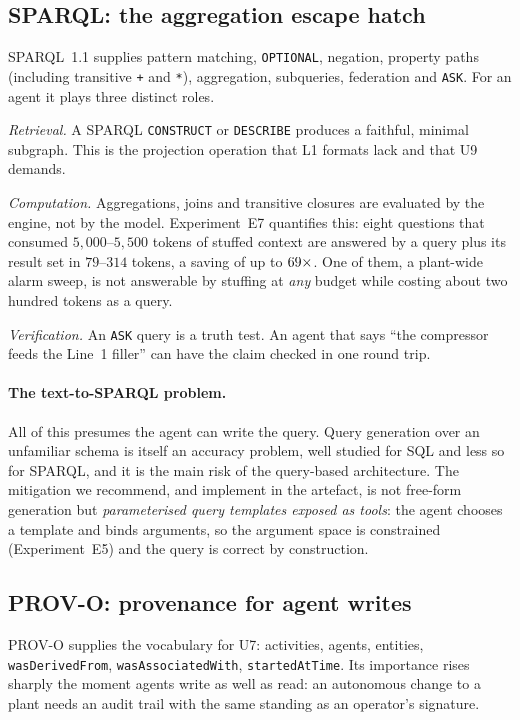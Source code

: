 \subsection{SPARQL: the aggregation escape hatch}

SPARQL~1.1 \cite{w3c2013sparql} supplies pattern matching, \texttt{OPTIONAL},
negation, property paths (including transitive \texttt{+} and \texttt{*}),
aggregation, subqueries, federation and \texttt{ASK}. For an agent it plays three distinct roles.

\emph{Retrieval.} A SPARQL \texttt{CONSTRUCT} or \texttt{DESCRIBE} produces a
faithful, minimal subgraph. This is the projection operation that L1 formats lack
and that U9 demands.

\emph{Computation.} Aggregations, joins and transitive closures are evaluated by
the engine, not by the model. Experiment~E7 quantifies this: eight questions that
consumed $5{,}000$--$5{,}500$ tokens of stuffed context are answered by a query
plus its result set in $79$--$314$ tokens, a saving of up to
$69\times$. One of them, a plant-wide alarm sweep, is not
answerable by stuffing at \emph{any} budget while costing about two hundred
tokens as a query.

\emph{Verification.} An \texttt{ASK} query is a truth test. An agent that says
``the compressor feeds the Line~1 filler'' can have the claim checked in one
round trip.

\paragraph{The text-to-SPARQL problem.} All of this presumes the agent can write
the query. Query generation over an unfamiliar schema is itself an accuracy
problem, well studied for SQL and less so for SPARQL, and it is the main risk of
the query-based architecture. The mitigation we recommend, and implement in the
artefact, is not free-form generation but \emph{parameterised query templates
exposed as tools}: the agent chooses a template and binds arguments, so the
argument space is constrained (Experiment~E5) and the query is correct by
construction.

\subsection{PROV-O: provenance for agent writes}

PROV-O \cite{w3c2013prov} supplies the vocabulary for U7: activities, agents,
entities, \texttt{wasDerivedFrom}, \texttt{wasAssociatedWith},
\texttt{startedAtTime}. Its importance rises sharply the moment agents write as
well as read: an autonomous change to a plant needs an audit trail with the same
standing as an operator's signature.

